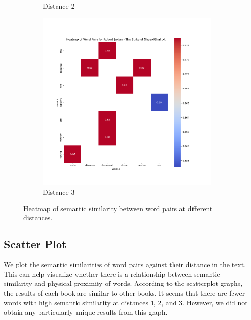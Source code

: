 \documentclass{article}
\begin{document}
\begin{figure}[H]
\begin{subfigure}[b]{0.3\textwidth}
        \caption{Distance 2}
        \label{fig:heatmap_2}
    \end{subfigure}
    \hfill
    \begin{subfigure}[b]{0.3\textwidth}
        \includegraphics[width=\textwidth]{img/Heat Map3.png}
        \caption{Distance 3}
        \label{fig:heatmap_3}
    \end{subfigure}
    \caption{Heatmap of semantic similarity between word pairs at different distances.}
    \label{fig:heatmaps}
\end{figure}

\subsection{Scatter Plot}

We plot the semantic similarities of word pairs against their distance in the text. This can help visualize whether there is a relationship between semantic similarity and physical proximity of words.
According to the scatterplot graphs, the results of each book are similar to other books. It seems that there are fewer words with high semantic similarity at distances 1, 2, and 3. However, we did not obtain any particularly unique results from this graph.
\end{document}
